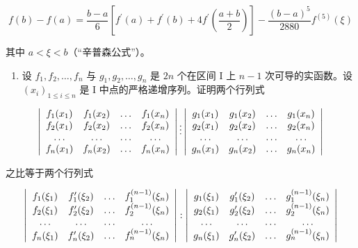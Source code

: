 \[
f (b) - f (a) = \frac {b - a}{6} \left[ f ^ {\prime} (a) + f ^ {\prime} (b) + 4 f ^ {\prime} \left(\frac {a + b}{2}\right) \right] - \frac {(b - a) ^ {5}}{2 8 8 0} f ^ {(5)} (\xi)
\]

其中 \(a < \xi < b\)（“辛普森公式”）。

\begin{enumerate}
\def\labelenumi{\arabic{enumi})}
\setcounter{enumi}{10}
\tightlist
\item
  设 \(f_{1}, f_{2}, \ldots, f_{n}\) 与 \(g_{1}, g_{2}, \ldots, g_{n}\) 是 \(2n\) 个在区间 I 上 \(n - 1\) 次可导的实函数。设 \((x_{i})_{1 \leqslant i \leqslant n}\) 是 I 中点的严格递增序列。证明两个行列式
\end{enumerate}

\[
\left| \begin{array}{c c c c} f _ {1} (x _ {1}) & f _ {1} (x _ {2}) & \dots & f _ {1} (x _ {n}) \\ f _ {2} (x _ {1}) & f _ {2} (x _ {2}) & \dots & f _ {2} (x _ {n}) \\ \dots & \dots & \dots & \dots \\ f _ {n} (x _ {1}) & f _ {n} (x _ {2}) & \dots & f _ {n} (x _ {n}) \end{array} \right| \vdots \left| \begin{array}{c c c c} g _ {1} (x _ {1}) & g _ {1} (x _ {2}) & \dots & g _ {1} (x _ {n}) \\ g _ {2} (x _ {1}) & g _ {2} (x _ {2}) & \dots & g _ {2} (x _ {n}) \\ \dots & \dots & \dots & \dots \\ g _ {n} (x _ {1}) & g _ {n} (x _ {2}) & \dots & g _ {n} (x _ {n}) \end{array} \right|
\]

之比等于两个行列式

\[
\left| \begin{array}{c c c c} f _ {1} (\xi_ {1}) & f _ {1} ^ {\prime} (\xi_ {2}) & \dots & f _ {1} ^ {(n - 1)} (\xi_ {n}) \\ f _ {2} (\xi_ {1}) & f _ {2} ^ {\prime} (\xi_ {2}) & \dots & f _ {2} ^ {(n - 1)} (\xi_ {n}) \\ \dots & \dots & \dots & \dots \\ f _ {n} (\xi_ {1}) & f _ {n} ^ {\prime} (\xi_ {2}) & \dots & f _ {n} ^ {(n - 1)} (\xi_ {n}) \end{array} \right|: \left| \begin{array}{c c c c} g _ {1} (\xi_ {1}) & g _ {1} ^ {\prime} (\xi_ {2}) & \dots & g _ {1} ^ {(n - 1)} (\xi_ {n}) \\ g _ {2} (\xi_ {1}) & g _ {2} ^ {\prime} (\xi_ {2}) & \dots & g _ {2} ^ {(n - 1)} (\xi_ {n}) \\ \dots & \dots & \dots & \dots \\ g _ {n} (\xi_ {1}) & g _ {n} ^ {\prime} (\xi_ {2}) & \dots & g _ {n} ^ {(n - 1)} (\xi_ {n}) \end{array} \right|
\]

